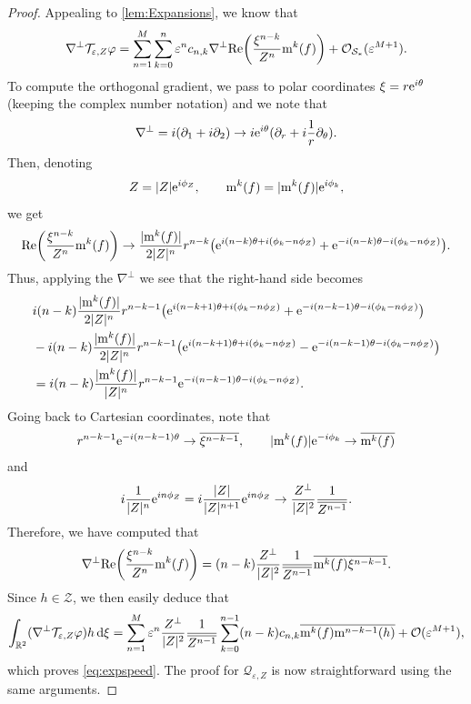 \documentclass[11pt,reqno,a4paper]{amsart}
\def\dd{{\rm d}}
\def\eps{\varepsilon}
\def\e{{\rm e}}
\def\de{{\partial}}
\def\RR {\mathbb{R}}
\def\Re{{\rm Re}}
\newcommand{\cO}{\mathcal{O}}
\newcommand{\cQ}{\mathcal{Q}}
\newcommand{\cS}{\mathcal{S}}
\newcommand{\cT}{\mathcal{T}}
\newcommand{\cZ}{\mathcal{Z}}
\newcommand{\mrm}{\mathrm{m}}
\newcommand{\1}{\mathbbm{1}}
\theoremstyle{definition}
\theoremstyle{definition}
\numberwithin{equation}{section}
\begin{document}
\begin{proof}
  Appealing to \cref{lem:Expansions}, we know that 
    \begin{align}
\nabla^\perp\cT_{\eps,Z}\varphi=\sum_{n=1}^M\sum_{k=0}^n\eps^nc_{n,k}\nabla^\perp\Re\bigg(\frac{\xi^{n-k}}{Z^n}\mrm^k(f)\bigg)+\cO_{\cS_*}(\eps^{M+1}).
    \end{align}
    To compute the orthogonal gradient, we pass to polar coordinates $\xi=r\e^{i\theta}$ (keeping the complex number notation) and we note that
    \begin{equation}
        \nabla^\perp =i(\de_1+i\de_2)\to i\e^{i\theta}(\de_r+i\frac{1}{r}\de_\theta).
    \end{equation}
    Then, denoting 
    \begin{align}
        Z=|Z|\e^{i\phi_Z}, \qquad \mrm^k(f)=|\mrm^k(f)|\e^{i\phi_k},
    \end{align}
we get    \begin{align}
    \Re\bigg(\frac{\xi^{n-k}}{Z^n}\mrm^k(f)\bigg)\to \frac{|\mrm^k(f)|}{2|Z|^n}r^{n-k}\big(\e^{i(n-k)\theta +i(\phi_k-n\phi_Z)}+\e^{-i(n-k)\theta -i(\phi_k-n\phi_Z)}\big).
    \end{align}
    Thus, applying the $\nabla^\perp$ we see that the right-hand side becomes 
    \begin{align}
    &i(n-k)\frac{|\mrm^k(f)|}{2|Z|^n}r^{n-k-1}\big(\e^{i(n-k+1)\theta +i(\phi_k-n\phi_Z)}+\e^{-i(n-k-1)\theta -i(\phi_k-n\phi_Z)}\big)\\
    &-i(n-k)\frac{|\mrm^k(f)|}{2|Z|^n}r^{n-k-1}\big(\e^{i(n-k+1)\theta +i(\phi_k-n\phi_Z)}-\e^{-i(n-k-1)\theta -i(\phi_k-n\phi_Z)}\big)\\
    &=i(n-k)\frac{|\mrm^k(f)|}{|Z|^n}r^{n-k-1}\e^{-i(n-k-1)\theta -i(\phi_k-n\phi_Z)}.
    \end{align}
    Going back to Cartesian coordinates, note that
    \begin{align}
        r^{n-k-1}\e^{-i(n-k-1)\theta}\to \overline{\xi^{n-k-1}}, \qquad |\mrm^k(f)|\e^{-i\phi_k}\to \overline{\mrm^{k}(f)}
    \end{align}
    and
    \begin{align}
        i\frac{1}{|Z|^n}\e^{in\phi_Z}=i\frac{|Z|}{|Z|^{n+1}}\e^{in\phi_Z}\to \frac{Z^\perp}{|Z|^{2}}\frac{1}{\overline{Z^{n-1}}}.
    \end{align}
    Therefore, we have computed that 
    \begin{align}
\nabla^\perp\Re\bigg(\frac{\xi^{n-k}}{Z^n}\mrm^k(f)\bigg)=(n-k)\frac{Z^\perp}{|Z|^{2}}\frac{1}{\overline{Z^{n-1}}}\overline{\mrm^{k}(f)}\overline{\xi^{n-k-1}}.
    \end{align}
    Since $h\in \cZ$, we then easily deduce that 
    \begin{align}
        \int_{\RR^2}(\nabla^\perp\cT_{\eps,Z}\varphi)h\, \dd\xi=\sum_{n=1}^M\eps^n\frac{Z^\perp}{|Z|^{2}}\frac{1}{\overline{Z^{n-1}}}\sum_{k=0}^{n-1}(n-k)c_{n,k}\overline{\mrm^k(f)}\overline{\mrm^{n-k-1}(h)}+\cO(\eps^{M+1}),
    \end{align}
    which proves \cref{eq:expspeed}.
    The proof for $\cQ_{\eps,Z}$ is now straightforward using the same arguments.
\end{proof}
\end{document}
